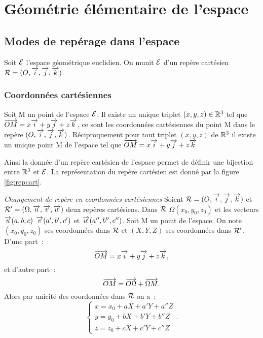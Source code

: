 \chapter{Géométrie élémentaire de l'espace}
\label{chap:geomEspace}
\minitoc
\minilof
\minilot
\section{Modes de repérage dans l'espace}
Soit \(\mathcal{E}\) l'espace géométrique euclidien. On munit \(\mathcal{E}\) d'un repère cartésien \(\mathcal{R}=(O,\overrightarrow{i},\overrightarrow{j},\overrightarrow{k})\).

\subsection{Coordonnées cartésiennes}
\begin{defdef}
  Soit M un point de l'espace \(\mathcal{E}\). Il existe un unique triplet \((x,y,z)\in\mathbb{R}^3\) tel que \(\overrightarrow{OM}=x\overrightarrow{i}+y\overrightarrow{j}+z\overrightarrow{k}\), ce sont les coordonnées cartésiennes du point M dans le repère \((O,\overrightarrow{i},\overrightarrow{j},\overrightarrow{k})\). Réciproquement pour tout triplet \((x,y,z)\) de \(\mathbb{R}^3\) il existe un unique point M de l'espace tel que \(\overrightarrow{OM}=x\overrightarrow{i}+y\overrightarrow{j}+z\overrightarrow{k}\)
\end{defdef}
Ainsi la donnée d'un repère cartésien de l'espace permet de définir une bijection entre \(\mathbb{R}^3\) et \(\mathcal{E}\). La représentation du repère cartésien est donné par la figure \ref{fig:repcart}.

\emph{Changement de repère en coordonnées cartésiennes}
Soient \(\mathcal{R}=(O,\overrightarrow{i},\overrightarrow{j},\overrightarrow{k})\) et \(\mathcal{R}'=(\Omega,\overrightarrow{u},\overrightarrow{v},\overrightarrow{w})\) deux repères cartésiens. Dans \(\mathcal{R}\) \(\Omega(x_0,y_0,z_0)\) et les vecteurs \(\overrightarrow{u}(a,b,c)\) \(\overrightarrow{v}(a',b',c')\) et \(\overrightarrow{w}(a'',b'',c'')\). Soit M un point de l'espace. On note \((x_0,y_0,z_0)\) ses coordonnées dans \(\mathcal{R}\) et \((X,Y,Z)\) ses coordonnées dans \(\mathcal{R}'\). D'une part~:
\begin{equation}
  \overrightarrow{OM}=x\overrightarrow{i}+y\overrightarrow{j}+z\overrightarrow{k},
\end{equation}
et d'autre part~:
\begin{equation}
  \overrightarrow{OM}=\overrightarrow{O\Omega}+\overrightarrow{\Omega M}.
\end{equation}
Alors par unicité des coordonnées dans \(\mathcal{R}\) on a~:
\begin{equation}
  \begin{cases}
    x=x_0+aX+a'Y+a''Z\\
    y=y_0+bX+b'Y+b''Z\\
    z=z_0+cX+c'Y+c''Z
  \end{cases}.
\end{equation}

